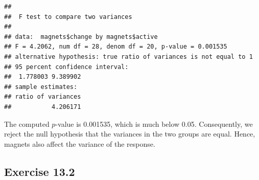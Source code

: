 \documentclass[
]{krantz}
\makeatletter
\newenvironment{Shaded}{\begin{snugshade}}{\end{snugshade}}
\newcommand{\KeywordTok}[1]{\textcolor[rgb]{0.13,0.29,0.53}{\textbf{#1}}}
\newcommand{\NormalTok}[1]{#1}
\newcommand{\OperatorTok}[1]{\textcolor[rgb]{0.81,0.36,0.00}{\textbf{#1}}}
\newcommand{\StringTok}[1]{\textcolor[rgb]{0.31,0.60,0.02}{#1}}
\newenvironment{kframe}{%
\medskip{}
\setlength{\fboxsep}{.8em}
 \def\at@end@of@kframe{}%
 \ifinner\ifhmode%
  \def\at@end@of@kframe{\end{minipage}}%
  \begin{minipage}{\columnwidth}%
 \fi\fi%
 \def\FrameCommand##1{\hskip\@totalleftmargin \hskip-\fboxsep
 \colorbox{shadecolor}{##1}\hskip-\fboxsep
     \hskip-\linewidth \hskip-\@totalleftmargin \hskip\columnwidth}%
 \MakeFramed {\advance\hsize-\width
   \@totalleftmargin\z@ \linewidth\hsize
   \@setminipage}}%
 {\par\unskip\endMakeFramed%
 \at@end@of@kframe}
\renewenvironment{Shaded}{\begin{kframe}}{\end{kframe}}
\theoremstyle{definition}
\theoremstyle{definition}
\theoremstyle{definition}
\theoremstyle{remark}
\makeatother
\begin{document}
\begin{enumerate}
\begin{Shaded}
\end{Shaded}

\begin{verbatim}
## 
##  F test to compare two variances
## 
## data:  magnets$change by magnets$active
## F = 4.2062, num df = 28, denom df = 20, p-value = 0.001535
## alternative hypothesis: true ratio of variances is not equal to 1
## 95 percent confidence interval:
##  1.778003 9.389902
## sample estimates:
## ratio of variances 
##           4.206171
\end{verbatim}

  The computed \(p\)-value is 0.001535, which is much below 0.05.
  Consequently, we reject the null hypothesis that the variances in the
  two groups are equal. Hence, magnets also affect the variance of the
  response.
\end{enumerate}

\hypertarget{exercise-13.2}{%
\subsection*{Exercise 13.2}\label{exercise-13.2}}
\end{document}
